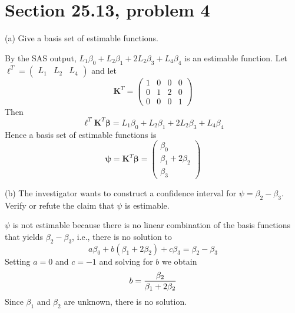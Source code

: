\section{Section 25.13, problem 4}
(a) Give a basis set of estimable functions.

\bigskip
\noindent
By the SAS output, $L_1\beta_0+L_2\beta_1+2L_2\beta_3+L_4\beta_4$
is an estimable function.
Let $\bm\ell^T=\begin{pmatrix} L_1 & L_2 & L_4\end{pmatrix}$ and let
\[
\mathbf K^T=
\begin{pmatrix}
1 & 0 & 0 & 0\\
0 & 1 & 2 & 0\\
0 & 0 & 0 & 1
\end{pmatrix}
\]
Then
\[
\bm\ell^T\mathbf K^T\bm\beta=L_1\beta_0+L_2\beta_1+2L_2\beta_3+L_4\beta_4
\]
Hence a basis set of estimable functions is
\[
\bm\psi=\mathbf K^T\bm\beta=
\begin{pmatrix}
\beta_0\\
\beta_1+2\beta_2\\
\beta_3
\end{pmatrix}
\]

\bigskip
\noindent
(b) The investigator wants to construct a confidence interval for
$\psi=\beta_2-\beta_3$.
Verify or refute the claim that $\psi$ is estimable.

\bigskip
\noindent
$\psi$ is not estimable because there is no linear combination
of the basis functions that yields $\beta_2-\beta_3$, i.e., there
is no solution to
\[
a\beta_0+b(\beta_1+2\beta_2)+c\beta_3=\beta_2-\beta_3
\]
Setting $a=0$ and $c=-1$ and solving for $b$ we obtain
\[
b={\beta_2\over\beta_1+2\beta_2}
\]
Since $\beta_1$ and $\beta_2$ are unknown, there is no solution.
